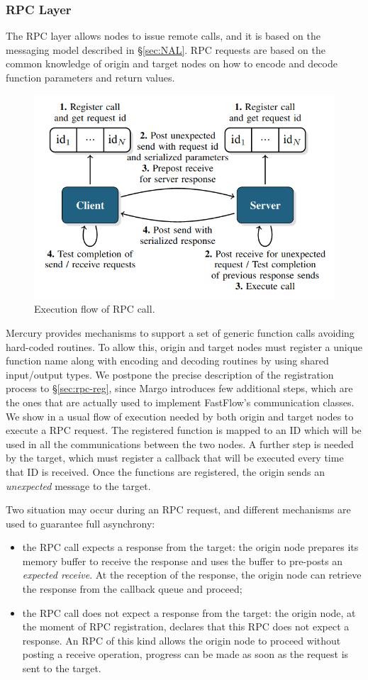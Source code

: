 \subsubsection{RPC Layer}
The RPC layer allows nodes to issue remote calls, and it is based on the messaging model described in \S\ref{sec:NAL}. RPC requests are based on the common knowledge of origin and target nodes on how to encode and decode function parameters and return values.\newline
\begin{figure}[H]
    \centering
    \includegraphics[width=0.6\linewidth]{res/rpc-flow.png}
    \caption{Execution flow of RPC call. }
    \label{fig:rpc-flow}
\end{figure}

Mercury provides mechanisms to support a set of generic function calls avoiding hard-coded routines. To allow this, origin and target nodes must register a unique function name along with encoding and decoding routines by using shared input/output types. We postpone the precise description of the registration process to \S\ref{sec:rpc-reg}, since Margo introduces few additional steps, which are the ones that are actually used to implement FastFlow's communication classes. We show in  a usual flow of execution needed by both origin and target nodes to execute a RPC request. The registered function is mapped to an ID which will be used in all the communications between the two nodes. A further step is needed by the target, which must register a callback that will be executed every time that ID is received. Once the functions are registered, the origin sends an \textit{unexpected} message to the target.\newline

Two situation may occur during an RPC request, and different mechanisms are used to guarantee full asynchrony:
\begin{itemize}
    \item the RPC call expects a response from the target: the origin node prepares its memory buffer to receive the response and uses the buffer to pre-posts an \textit{expected receive}. At the reception of the response, the origin node can retrieve the response from the callback queue and proceed;
    \item the RPC call does not expect a response from the target: the origin node, at the moment of RPC registration, declares that this RPC does not expect a response. An RPC of this kind allows the origin node to proceed without posting a receive operation, progress can be made as soon as the request is sent to the target.
\end{itemize}

